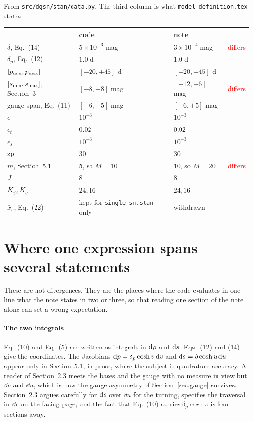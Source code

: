 \documentclass[11pt]{article}
\newcommand{\file}[1]{\texttt{#1}}
\begin{document}
From \file{src/dgsn/stan/data.py}. The third column is what
\file{model-definition.tex} states.

\begin{tabular}{llll}
\toprule
 & code & note & \\
\midrule
$\delta$, Eq.~(14)        & $5\times10^{-3}$ mag & $3\times10^{-4}$ mag & \textcolor{red}{differs} \\
$\delta_{p}$, Eq.~(12)    & $1.0$ d & $1.0$ d & \\
$[p_{\min}, p_{\max}]$ & $[-20, +45]$ d & $[-20, +45]$ d & \\
$[s_{\min}, s_{\max}]$, Section~3 & $[-8, +8]$ mag & $[-12, +6]$ mag & \textcolor{red}{differs} \\
gauge span, Eq.~(11)      & $[-6, +5]$ mag & $[-6, +5]$ mag & \\
$\epsilon$                & $10^{-3}$ & $10^{-3}$ & \\
$\epsilon_{t}$            & $0.02$ & $0.02$ & \\
$\epsilon_{s}$            & $10^{-3}$ & $10^{-3}$ & \\
$\mathrm{zp}$                     & $30$ & $30$ & \\
$m$, Section~5.1          & $5$, so $M = 10$ & $10$, so $M = 20$ & \textcolor{red}{differs} \\
$J$                       & $8$ & $8$ & \\
$K_{\psi}, K_{q}$         & $24, 16$ & $24, 16$ & \\
$\bar x_{s}$, Eq.~(22)    & kept for \file{single\_sn.stan} only & withdrawn & \\
\bottomrule
\end{tabular}

\section{Where one expression spans several statements}
\label{sec:fused}

These are not divergences. They are the places where the code evaluates in one line what the
note states in two or three, so that reading one section of the note alone can set a wrong
expectation.

\paragraph{The two integrals.} Eq.~(10) and Eq.~(5) are written as integrals in $\mathrm{d}p$
and $\mathrm{d}s$. Eqs.~(12) and (14) give the coordinates. The Jacobians
$\mathrm{d}p = \delta_{p}\cosh v\,\mathrm{d} v$ and $\mathrm{d}s = \delta\cosh u\,\mathrm{d} u$ appear only in
Section~5.1, in prose, where the subject is quadrature accuracy. A reader of Section~2.3
meets the bases and the gauge with no measure in view but $\dd v$ and $\dd u$, which is how
the gauge asymmetry of Section~\ref{sec:gauge} survives: Section~2.3 argues carefully for
$\mathrm{d}s$ over $\dd u$ for the turning, specifies the traversal in $\dd v$ on the facing
page, and the fact that Eq.~(10) carries $\delta_{p}\cosh v$ is four sections away.
\end{document}
